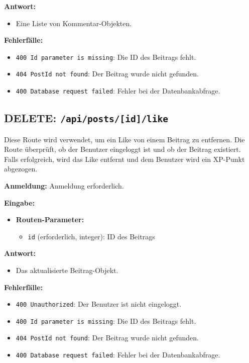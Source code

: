 \documentclass[a4paper,12pt]{article}
\begin{document}
\textbf{Antwort:}
\begin{itemize}
    \item Eine Liste von Kommentar-Objekten.
\end{itemize}

\textbf{Fehlerfälle:}
\begin{itemize}
    \item \texttt{400 Id parameter is missing}:
        Die ID des Beitrags fehlt.
    \item \texttt{404 PostId not found}:
        Der Beitrag wurde nicht gefunden.
    \item \texttt{400 Database request failed}:
        Fehler bei der Datenbankabfrage.
\end{itemize}

\newpage
\subsection{DELETE: \texttt{/api/posts/[id]/like}}

Diese Route wird verwendet, um ein Like von einem Beitrag zu entfernen. Die
Route überprüft, ob der Benutzer eingeloggt ist und ob der Beitrag existiert.
Falls erfolgreich, wird das Like entfernt und dem Benutzer wird ein XP-Punkt
abgezogen.

\textbf{Anmeldung:} Anmeldung erforderlich.

\textbf{Eingabe:}
\begin{itemize}
    \item \textbf{Routen-Parameter:}
    \begin{itemize}
        \item \texttt{id} (erforderlich, integer):
            ID des Beitrags
    \end{itemize}
\end{itemize}

\textbf{Antwort:}
\begin{itemize}
    \item Das aktualisierte Beitrag-Objekt.
\end{itemize}

\textbf{Fehlerfälle:}
\begin{itemize}
    \item \texttt{400 Unauthorized}:
        Der Benutzer ist nicht eingeloggt.
    \item \texttt{400 Id parameter is missing}:
        Die ID des Beitrags fehlt.
    \item \texttt{404 PostId not found}:
        Der Beitrag wurde nicht gefunden.
    \item \texttt{400 Database request failed}:
        Fehler bei der Datenbankabfrage.
\end{itemize}
\end{document}

